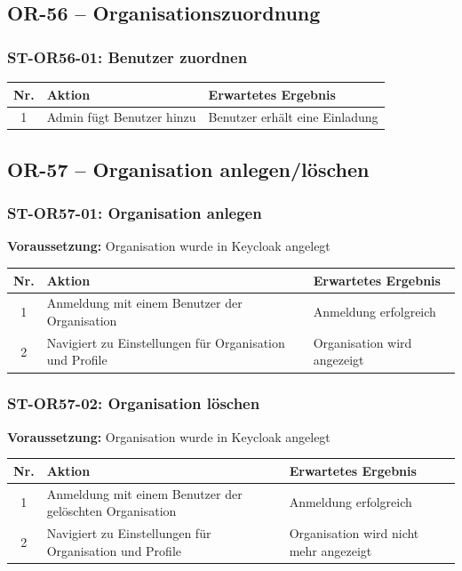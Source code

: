 \documentclass[a4paper,11pt]{article}
\begin{document}
\subsection{OR-56 -- Organisationszuordnung}

\subsubsection*{ST-OR56-01: Benutzer zuordnen}
\begin{longtable}{cp{5.5cm}p{5.5cm}}
    \toprule
    \textbf{Nr.} & \textbf{Aktion} & \textbf{Erwartetes Ergebnis} \\
    \midrule
    1 & Admin fügt Benutzer hinzu & Benutzer erhält eine Einladung \\
    \bottomrule
\end{longtable}

\subsection{OR-57 -- Organisation anlegen/löschen}

\subsubsection*{ST-OR57-01: Organisation anlegen}
\textbf{Voraussetzung:} Organisation wurde in Keycloak angelegt \\

\begin{longtable}{cp{5.5cm}p{5.5cm}}
    \toprule
    \textbf{Nr.} & \textbf{Aktion} & \textbf{Erwartetes Ergebnis} \\
    \midrule
    1 & Anmeldung mit einem Benutzer der Organisation & Anmeldung erfolgreich \\
    2 & Navigiert zu Einstellungen für Organisation und Profile & Organisation wird angezeigt \\
    \bottomrule
\end{longtable}

\subsubsection*{ST-OR57-02: Organisation löschen}
\textbf{Voraussetzung:} Organisation wurde in Keycloak angelegt \\

\begin{longtable}{cp{5.5cm}p{5.5cm}}
    \toprule
    \textbf{Nr.} & \textbf{Aktion} & \textbf{Erwartetes Ergebnis} \\
    \midrule
    1 & Anmeldung mit einem Benutzer der gelöschten Organisation & Anmeldung erfolgreich \\
    2 & Navigiert zu Einstellungen für Organisation und Profile & Organisation wird nicht mehr angezeigt \\
    \bottomrule
\end{longtable}
\end{document}

